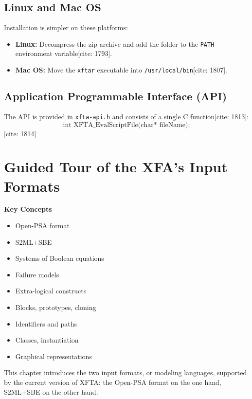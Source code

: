 \section{Linux and Mac OS}
Installation is simpler on these platforms:
\begin{itemize}
    \item \textbf{Linux:} Decompress the zip archive and add the folder to the \texttt{PATH} environment variable[cite: 1793].
    \item \textbf{Mac OS:} Move the \texttt{xftar} executable into \texttt{/usr/local/bin}[cite: 1807].
\end{itemize}

\section{Application Programmable Interface (API)}
The API is provided in \texttt{xfta-api.h} and consists of a single C function[cite: 1813]:
\begin{equation*}
\text{int XFTA\_EvalScriptFile(char* fileName);}
\end{equation*}
[cite: 1814]

\chapter{Guided Tour of the XFA's Input Formats}

\textbf{Key Concepts}
\begin{itemize}
    \item Open-PSA format
    \item S2ML+SBE
    \item Systems of Boolean equations
    \item Failure models
    \item Extra-logical constructs
    \item Blocks, prototypes, cloning
    \item Identifiers and paths
    \item Classes, instantiation
    \item Graphical representations
\end{itemize}

This chapter introduces the two input formats, or modeling languages, supported by the current version of XFTA: the Open-PSA format on the one hand, S2ML+SBE on the other hand.

